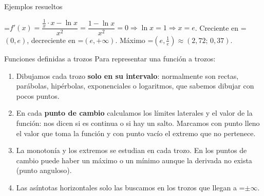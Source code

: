 \documentclass[11pt,a4paper]{article}
\newcommand{\fmm}[1]{\setbox0=\hbox{$#1$}\ifdim\wd0>\linewidth\[#1\]\else\mbox{\box0}\fi}
\begin{document}
\begin{fmex}{Ejemplos resueltos}
\begin{enumerate}[label=\textbf{\arabic*.},leftmargin=*]
            

\fmm{f'(x)=\dfrac{\frac1x\cdot x-\ln x}{x^2}=\dfrac{1-\ln x}{x^2}=0\Rightarrow\ln x=1\Rightarrow x=e}. Creciente en \fmm{(0,e)}, decreciente en \fmm{(e,+\infty)}. Máximo \fmm{\left(e,\frac1e\right)\approx(2{,}72;\,0{,}37)}.

            

\begin{center}\end{center}
\end{enumerate}
\end{fmex}

  
\begin{fmdef}{Funciones definidas a trozos}
Para representar una función a trozos:

      
\begin{enumerate}
\item Dibujamos cada trozo \textbf{solo en su intervalo}: normalmente son rectas, parábolas, hipérbolas, exponenciales o logaritmos, que sabemos dibujar con pocos puntos.
\item En cada \textbf{punto de cambio} calculamos los límites laterales y el valor de la función: nos dicen si es continua o si hay un salto. Marcamos con punto lleno el valor que toma la función y con punto vacío el extremo que no pertenece.
\item La monotonía y los extremos se estudian en cada trozo. En los puntos de cambio puede haber un máximo o un mínimo aunque la derivada no exista (punto anguloso).
\item Las asíntotas horizontales solo las buscamos en los trozos que llegan a \fmm{\pm\infty}.
\end{enumerate}
\end{fmdef}
\end{document}
